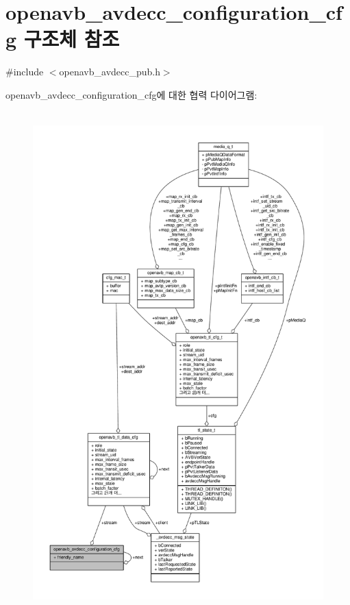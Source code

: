 \hypertarget{structopenavb__avdecc__configuration__cfg}{}\section{openavb\+\_\+avdecc\+\_\+configuration\+\_\+cfg 구조체 참조}
\label{structopenavb__avdecc__configuration__cfg}


{\ttfamily \#include $<$openavb\+\_\+avdecc\+\_\+pub.\+h$>$}



openavb\+\_\+avdecc\+\_\+configuration\+\_\+cfg에 대한 협력 다이어그램\+:
\nopagebreak
\begin{figure}[H]
\begin{center}
\leavevmode
\includegraphics[height=550pt]{structopenavb__avdecc__configuration__cfg__coll__graph}
\end{center}
\end{figure}
